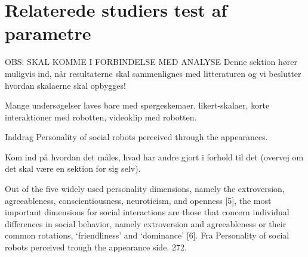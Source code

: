 \section{Relaterede studiers test af parametre}
\label{ParametreTidligereStudier}
%
OBS: SKAL KOMME I FORBINDELSE MED ANALYSE\blankline
%
Denne sektion hører muligvis ind, når resultaterne skal sammenlignes med litteraturen og vi beslutter hvordan skalaerne skal opbygges!\blankline


Mange undersøgelser laves bare med spørgeskemaer, likert-skalaer, korte interaktioner med robotten, videoklip med robotten. 

\noindent Inddrag Personality of social robots perceived through the appearances.

\noindent Kom ind på hvordan det måles, hvad har andre gjort i forhold til det (overvej om det skal være en sektion for sig selv).\blankline


Out of the five widely used personality dimensions, namely the extroversion, agreeableness, conscientiousness, neuroticism, and openness [5], the most important dimensions for social interactions are those that concern individual differences in social behavior, namely extroversion and agreeableness or their common rotations, ‘friendliness’ and ‘dominance’ [6]. Fra Personality of social robots perceived trough the appearance side. 272.
